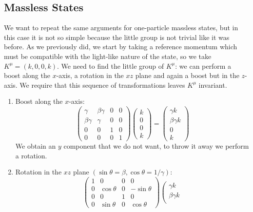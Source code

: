 \documentclass[../main.tex]{subfiles}
\begin{document}
\subsection{Massless States}
We want to repeat the same arguments for one-particle massless states, but in this case it is not so simple because the little group is not trivial like it was before. As we previously did, we start by taking a reference momentum which must be compatible with the light-like nature of the state, so we take $K^\mu=(k,0,0,k)$. We need to find the little group of $K^\mu$: we can perform a boost along the $x$-axis, a rotation in the $xz$ plane and again a boost but in the $z$-axis. We require that this sequence of transformations leaves $K^\mu$ invariant.
\begin{enumerate}
    \item Boost along the $x$-axis:
    \[
    \left(\begin{array}{cccc}
    \gamma & \beta\gamma & 0 & 0 \\
    \beta\gamma & \gamma & 0 & 0 \\
    0 & 0 & 1 & 0 \\
    0 & 0 & 0 & 1 
    \end{array}\right)
    \left(\begin{array}{c}
    k \\
    0 \\
    0 \\
    k
    \end{array}\right)=
    \left(\begin{array}{c}
    \gamma k \\
    \beta\gamma k \\
    0 \\
    k
    \end{array}\right)
    \]
    We obtain an $y$ component that we do not want, to throw it away we perform a rotation.
    \item Rotation in the $xz$ plane $(\sin\theta=\beta, \cos\theta=1/\gamma)$:
    \[
    \left(\begin{array}{cccc}
    1 & 0 & 0 & 0 \\
    0 & \cos\theta & 0 & -\sin\theta \\
    0 & 0 & 1 & 0 \\
    0 & \sin\theta & 0 & \cos\theta 
    \end{array}\right)
    \left(\begin{array}{c}
    \gamma k \\
    \beta\gamma k \\

\end{array}\]
\end{enumerate}
\end{document}
